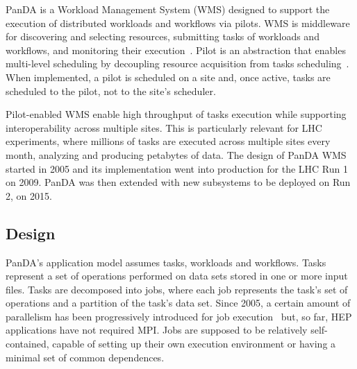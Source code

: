 PanDA is a Workload Management System (WMS) designed to support the execution of
distributed workloads and workflows via pilots. WMS is middleware for
discovering and selecting resources, submitting tasks of workloads and
workflows, and monitoring their execution~\cite{marco2009glite}. Pilot is an
abstraction that enables multi-level scheduling by decoupling resource
acquisition from tasks scheduling~\cite{turilli2015comprehensive}. When
implemented, a pilot is scheduled on a site and, once active, tasks are
scheduled to the pilot, not to the site's scheduler.

Pilot-enabled WMS enable high throughput of tasks execution while supporting
interoperability across multiple sites. This is particularly relevant for LHC
experiments, where millions of tasks are executed across multiple sites every
month, analyzing and producing petabytes of data. The design of PanDA WMS
started in 2005 and its implementation went into production for the LHC Run 1 on
2009. PanDA was then extended with new subsystems to be deployed on Run 2, on
2015.



\subsection{Design}
\label{ssec:panda_design}


PanDA's application model assumes tasks, workloads and workflows. Tasks
represent a set of operations performed on
data sets stored in one or more input files. Tasks are decomposed into jobs,
where each job represents the task's set of operations and a partition of the
task's
data set. Since 2005, a certain amount of parallelism has been
progressively introduced for job execution~\cite{crooks2012multi} but, so far,
HEP applications have not required MPI. Jobs are supposed to be relatively self-contained, capable of setting
up their own execution environment or having a minimal set of common
dependences.

